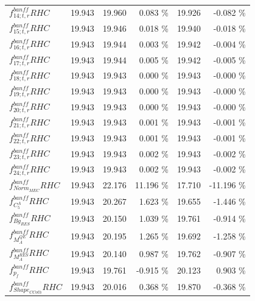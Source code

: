 {\begin{table}
\begin{tabular}{| l | r | r  r | r  r |}
                        $f_{14; t, r}^{banff} RHC$ & 19.943 & 19.960 &   0.083 \%  &  19.926 &  -0.082 \%  \\ 
                        $f_{15; t, r}^{banff} RHC$ & 19.943 & 19.946 &   0.018 \%  &  19.940 &  -0.018 \%  \\ 
                        $f_{16; t, r}^{banff} RHC$ & 19.943 & 19.944 &   0.003 \%  &  19.942 &  -0.004 \%  \\ 
                        $f_{17; t, r}^{banff} RHC$ & 19.943 & 19.944 &   0.005 \%  &  19.942 &  -0.005 \%  \\ 
                        $f_{18; t, r}^{banff} RHC$ & 19.943 & 19.943 &   0.000 \%  &  19.943 &  -0.000 \%  \\ 
                        $f_{19; t, r}^{banff} RHC$ & 19.943 & 19.943 &   0.000 \%  &  19.943 &  -0.000 \%  \\ 
                        $f_{20; t, r}^{banff} RHC$ & 19.943 & 19.943 &   0.000 \%  &  19.943 &  -0.000 \%  \\ 
                        $f_{21; t, r}^{banff} RHC$ & 19.943 & 19.943 &   0.001 \%  &  19.943 &  -0.001 \%  \\ 
                        $f_{22; t, r}^{banff} RHC$ & 19.943 & 19.943 &   0.001 \%  &  19.943 &  -0.001 \%  \\ 
                        $f_{23; t, r}^{banff} RHC$ & 19.943 & 19.943 &   0.002 \%  &  19.943 &  -0.002 \%  \\ 
                        $f_{24; t, r}^{banff} RHC$ & 19.943 & 19.943 &   0.002 \%  &  19.943 &  -0.002 \%  \\ 
                      $f_{Norm_{MEC}}^{banff} RHC$ & 19.943 & 22.176 &  11.196 \%  &  17.710 & -11.196 \%  \\ 
                       $f_{C^{A}_{5}}^{banff} RHC$ & 19.943 & 20.267 &   1.623 \%  &  19.655 &  -1.446 \%  \\ 
                        $f_{Bg_{RES}}^{banff} RHC$ & 19.943 & 20.150 &   1.039 \%  &  19.761 &  -0.914 \%  \\ 
                        $f_{M_A^{QE}}^{banff} RHC$ & 19.943 & 20.195 &   1.265 \%  &  19.692 &  -1.258 \%  \\ 
                       $f_{M_A^{RES}}^{banff} RHC$ & 19.943 & 20.140 &   0.987 \%  &  19.762 &  -0.907 \%  \\ 
                           $f_{p_{f}}^{banff} RHC$ & 19.943 & 19.761 &  -0.915 \%  &  20.123 &   0.903 \%  \\ 
                   $f_{Shape_{CCoth}}^{banff} RHC$ & 19.943 & 20.016 &   0.368 \%  &  19.870 &  -0.368 \%  \\ 

\end{tabular}
\end{table}}
